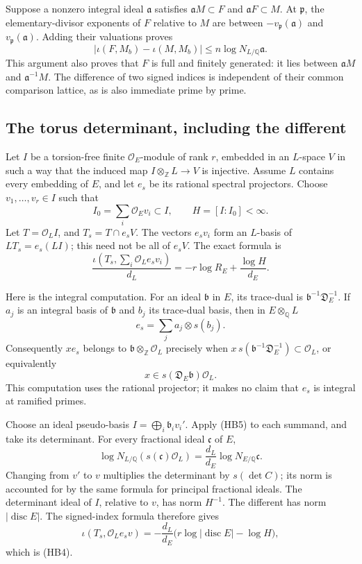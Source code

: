 Suppose a nonzero integral ideal \(\mathfrak a\) satisfies
\(\mathfrak a M\subset F\) and \(\mathfrak a F\subset M\).
At \(\mathfrak p\), the elementary-divisor exponents of \(F\)
relative to \(M\) are between
\(-v_{\mathfrak p}(\mathfrak a)\) and
\(v_{\mathfrak p}(\mathfrak a)\).
Adding their valuations proves
\[
 |\iota(F,M_b)-\iota(M,M_b)|
                    \le n\log N_{L/\mathbb Q}\mathfrak a.
 \tag{HB3}\label{eq:sr-hb-commensurable}
\]
This argument also proves that \(F\) is full and finitely generated:
it lies between \(\mathfrak a M\) and \(\mathfrak a^{-1}M\).
The difference of two signed indices is independent of their
common comparison lattice, as is also immediate prime by prime.

\subsection{The torus determinant, including the different}

Let \(I\) be a torsion-free finite \(\mathcal O_E\)-module of
rank \(r\), embedded in an \(L\)-space \(V\) in such a way that
the induced map \(I\otimes_{\mathbb Z}L\to V\) is injective.
Assume \(L\) contains every embedding of \(E\), and let \(e_s\)
be its rational spectral projectors.  Choose
\(v_1,\ldots,v_r\in I\) such that
\[
 I_0=\sum_i\mathcal O_Ev_i\subset I,\qquad H=[I:I_0]<\infty.
\]
Let \(T=\mathcal O_L I\), and
\(T_s=T\cap e_sV\).  The vectors \(e_sv_i\) form an \(L\)-basis
of \(L T_s=e_s(LI)\); this need not be all of \(e_sV\).  The exact formula is
\[
 \frac{\iota(T_s,\sum_i\mathcal O_Le_sv_i)}{d_L}
                       =-r\log R_E+\frac{\log H}{d_E}.
 \tag{HB4}\label{eq:sr-hb-torus-index}
\]

Here is the integral computation.
For an ideal \(\mathfrak b\) in \(E\), its trace-dual is
\(\mathfrak b^{-1}\mathfrak D_E^{-1}\).
If \(a_j\) is an integral basis of \(\mathfrak b\)
and \(b_j\) its trace-dual basis, then in
\(E\otimes_{\mathbb Q}L\)
\[
                         e_s=\sum_j a_j\otimes s(b_j).
\]
Consequently \(x e_s\) belongs to
\(\mathfrak b\otimes_{\mathbb Z}\mathcal O_L\) precisely when
\(x\,s(\mathfrak b^{-1}\mathfrak D_E^{-1})
\subset\mathcal O_L\), or equivalently
\[
                         x\in s(\mathfrak D_E\mathfrak b)
                                               \mathcal O_L.
 \tag{HB5}
\]
This computation uses the rational projector; it makes no claim
that \(e_s\) is integral at ramified primes.

Choose an ideal pseudo-basis \(I=\bigoplus_i\mathfrak b_i v_i'\).
Apply (HB5) to each summand, and take its determinant.
For every fractional ideal \(\mathfrak c\) of \(E\),
\[
 \log N_{L/\mathbb Q}(s(\mathfrak c)\mathcal O_L)
                    =\frac{d_L}{d_E}\log N_{E/\mathbb Q}\mathfrak c.
\]
Changing from \(v'\) to \(v\) multiplies the determinant
by \(s(\det C)\); its norm is accounted for by the same formula
for principal fractional ideals.
The determinant ideal of \(I\), relative to \(v\), has norm
\(H^{-1}\).  The different has norm
\(|\operatorname{disc}E|\).
The signed-index formula therefore gives
\[
 \iota(T_s,\mathcal O_L e_sv)
 =-\frac{d_L}{d_E}\bigl(r\log|\operatorname{disc}E|-\log H\bigr),
\]
which is (HB4).

